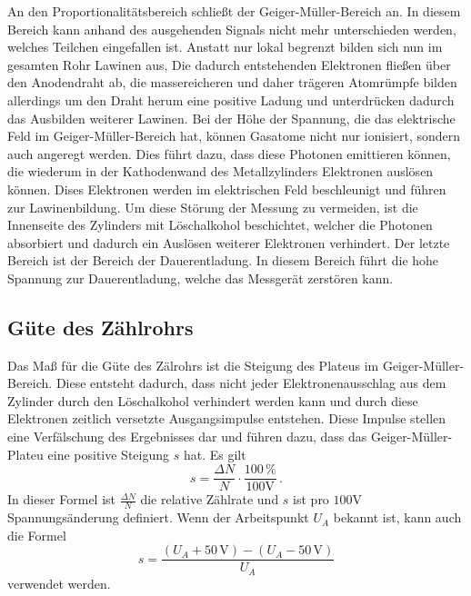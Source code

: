 An den Proportionalitätsbereich schließt der Geiger-Müller-Bereich an. In diesem Bereich 
kann anhand des ausgehenden Signals nicht mehr unterschieden werden, welches Teilchen 
eingefallen ist. Anstatt nur lokal begrenzt bilden sich nun im gesamten Rohr Lawinen aus, 
Die dadurch entstehenden Elektronen fließen über den Anodendraht ab, die massereicheren und daher 
trägeren Atomrümpfe bilden allerdings um den Draht herum eine positive Ladung und unterdrücken
dadurch das Ausbilden weiterer Lawinen. Bei der Höhe der Spannung, die das elektrische 
Feld im Geiger-Müller-Bereich hat, können Gasatome nicht nur ionisiert, sondern auch 
angeregt werden. Dies führt dazu, dass diese Photonen emittieren können, die wiederum in 
der Kathodenwand des Metallzylinders Elektronen auslösen können. Dises Elektronen werden
im elektrischen Feld beschleunigt und führen zur Lawinenbildung. Um diese Störung der
Messung zu vermeiden, ist die Innenseite des Zylinders mit Löschalkohol beschichtet, welcher
die Photonen absorbiert und dadurch ein Auslösen weiterer Elektronen verhindert. Der 
letzte Bereich ist der Bereich der Dauerentladung. In diesem Bereich führt die hohe Spannung
zur Dauerentladung, welche das Messgerät zerstören kann.  

\subsection{Güte des Zählrohrs}
Das Maß für die Güte des Zälrohrs ist die Steigung des Plateus im Geiger-Müller-Bereich. 
Diese entsteht dadurch, dass nicht jeder Elektronenausschlag aus dem Zylinder durch den 
Löschalkohol verhindert werden kann und durch diese Elektronen zeitlich versetzte 
Ausgangsimpulse entstehen. Diese Impulse stellen eine Verfälschung des Ergebnisses dar und 
führen dazu, dass das Geiger-Müller-Plateu eine positive Steigung $s$ hat. Es gilt 
\begin{equation}
    s = \frac{\Delta N}{N} \cdot \frac{100 \,\%}{100 \unit{\volt}} \, .
    \label{eqn:s_anderes}
\end{equation}
In dieser Formel ist $\frac{\Delta N}{N}$ die relative Zählrate und $s$ ist pro 
$100 \unit{\volt}$ Spannungsänderung definiert. Wenn der Arbeitspunkt $U_A$ bekannt ist, 
kann auch die Formel 
\begin{equation}
    s = \frac{\left(U_A + 50 \, \unit{\volt}\right) - \left(U_A - 50 \, \unit{\volt} \right)}{U_A}
    \label{eqn:s_arbeitspunkt}
\end{equation}
verwendet werden.
